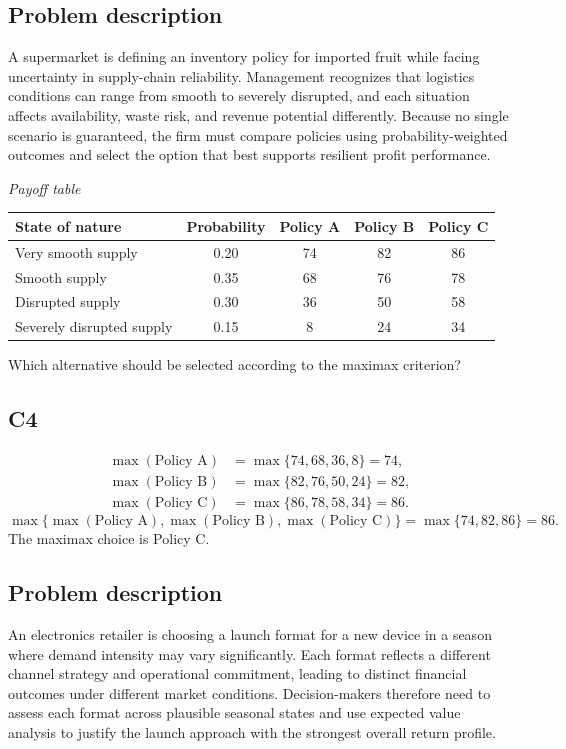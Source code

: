 \begin{ExamProblems}
		\subsection*{Problem description}
		A supermarket is defining an inventory policy for imported fruit while facing uncertainty in supply-chain reliability. Management recognizes that logistics conditions can range from smooth to severely disrupted, and each situation affects availability, waste risk, and revenue potential differently. Because no single scenario is guaranteed, the firm must compare policies using probability-weighted outcomes and select the option that best supports resilient profit performance.

		\begin{center}
			\textit{Payoff table} \par
			\begin{tabular}{l c c c c}
				\toprule
				State of nature & Probability & Policy A & Policy B & Policy C \\
				\midrule
				Very smooth supply & 0.20 & 74 & 82 & 86 \\
				Smooth supply & 0.35 & 68 & 76 & 78 \\
				Disrupted supply & 0.30 & 36 & 50 & 58 \\
				Severely disrupted supply & 0.15 & 8 & 24 & 34 \\
				\bottomrule
			\end{tabular}
		\end{center}

		Which alternative should be selected according to the maximax criterion?

		\subsection*{C4}
		\[
		\begin{aligned}
		\max(\text{Policy A}) &= \max\{74,68,36,8\} = 74,\\
		\max(\text{Policy B}) &= \max\{82,76,50,24\} = 82,\\
		\max(\text{Policy C}) &= \max\{86,78,58,34\} = 86.
		\end{aligned}
		\]
		\[
		\max\{\max(\text{Policy A}),\max(\text{Policy B}),\max(\text{Policy C})\}
		= \max\{74,82,86\}
		= 86.
		\]
		The maximax choice is Policy C.
		\item
		\subsection*{Problem description}
		An electronics retailer is choosing a launch format for a new device in a season where demand intensity may vary significantly. Each format reflects a different channel strategy and operational commitment, leading to distinct financial outcomes under different market conditions. Decision-makers therefore need to assess each format across plausible seasonal states and use expected value analysis to justify the launch approach with the strongest overall return profile.


\end{ExamProblems}
